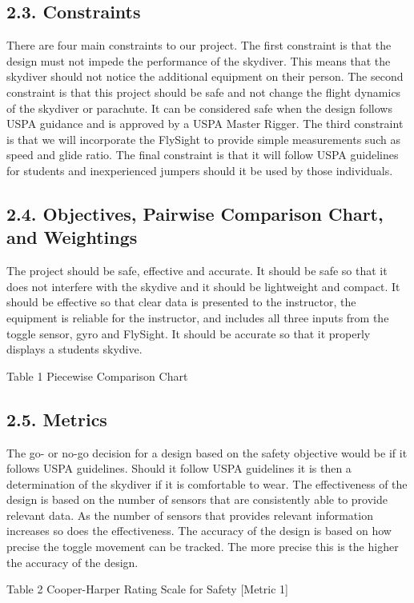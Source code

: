 \documentclass[10pt]{article}
\begin{document}
\subsection{2.3. Constraints}
There are four main constraints to our project. The first constraint is that the design must not impede the performance of the skydiver. This means that the skydiver should not notice the additional equipment on their person. The second constraint is that this project should be safe and not change the flight dynamics of the skydiver or parachute. It can be considered safe when the design follows USPA guidance and is approved by a USPA Master Rigger. The third constraint is that we will incorporate the FlySight to provide simple measurements such as speed and glide ratio. The final constraint is that it will follow USPA guidelines for students and inexperienced jumpers should it be used by those individuals.

\subsection{2.4. Objectives, Pairwise Comparison Chart, and Weightings}
The project should be safe, effective and accurate. It should be safe so that it does not interfere with the skydive and it should be lightweight and compact. It should be effective so that clear data is presented to the instructor, the equipment is reliable for the instructor, and includes all three inputs from the toggle sensor, gyro and FlySight. It should be accurate so that it properly displays a students skydive.

Table 1 Piecewise Comparison Chart

\subsection{2.5. Metrics}
The go- or no-go decision for a design based on the safety objective would be if it follows USPA guidelines. Should it follow USPA guidelines it is then a determination of the skydiver if it is comfortable to wear. The effectiveness of the design is based on the number of sensors that are consistently able to provide relevant data. As the number of sensors that provides relevant information increases so does the effectiveness. The accuracy of the design is based on how precise the toggle movement can be tracked. The more precise this is the higher the accuracy of the design.

Table 2 Cooper-Harper Rating Scale for Safety [Metric 1]
\end{document}
